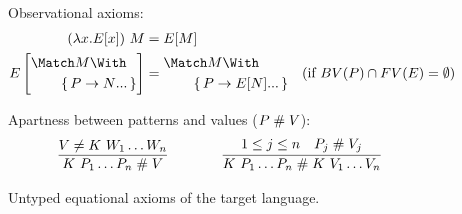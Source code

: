 \documentclass[runningheads]{llncs}
\begin{document}
\begin{figure}
Observational axioms:
\begin{align*}
  (\lambda x. E[x]) ~ M
  &=
  E[M]
  \\
  E\left[
    \begin{aligned}
      &\Match M \With \\
      &\qquad\set{\many{P \to N}}
    \end{aligned}
  \right]
  &=
  \begin{aligned}
    &\Match M \With \\
    &\qquad \set{\many{P \to E[N]}}
  \end{aligned}
  &(\text{if } BV(P) \cap FV(E) = \emptyset)
\end{align*}

Apartness between patterns and values ($P \mathrel{\#} V$):
\begin{gather*}
  \infer
  {K ~ P_1 \dots P_n \apart V}
  {V \neq K ~ W_1 \dots W_n}
  \qqqquad
  \infer
  {K~P_1 \dots P_n \apart K ~ V_1 \dots V_n}
  {1 \leq j \leq n & P_j \apart V_j}
\end{gather*}

\caption{Untyped equational axioms of the target language.}
\label{fig:target-equality}
\end{figure}
\end{document}
